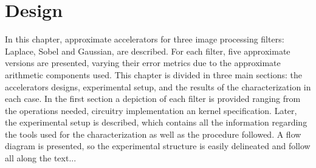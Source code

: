 \chapter{Design}
\label{ch:design}

In this chapter, approximate accelerators for three image processing filters:
Laplace, Sobel and Gaussian, are described. For each filter, five approximate
versions are presented, varying their error metrics due to the approximate
arithmetic components used. This chapter is divided in three main sections:
the accelerators designs, experimental setup, and the results of the
characterization in each case. In the first section a depiction of each filter
is provided ranging from the operations needed, circuitry implementation an
kernel specification. Later, the experimental setup is described, which
contains all the information regarding the tools used for the characterization
as well as the procedure followed. A flow diagram is presented,
so the experimental structure is easily delineated and follow all along the
text...